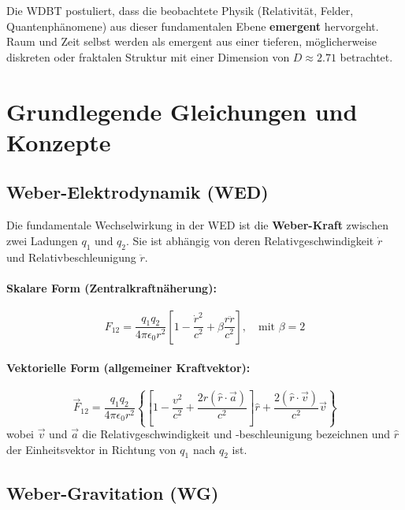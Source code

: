 \documentclass[11pt, a4paper]{article}
\begin{document}
Die WDBT postuliert, dass die beobachtete Physik (Relativität, Felder, Quantenphänomene) aus dieser fundamentalen Ebene \textbf{emergent} hervorgeht. Raum und Zeit selbst werden als emergent aus einer tieferen, möglicherweise diskreten oder fraktalen Struktur mit einer Dimension von $D \approx 2.71$ betrachtet.

\section{Grundlegende Gleichungen und Konzepte}
\label{sec:grundlagen}

\subsection{Weber-Elektrodynamik (WED)}
\label{subsec:wed}

Die fundamentale Wechselwirkung in der WED ist die \textbf{Weber-Kraft} zwischen zwei Ladungen $q_1$ und $q_2$. Sie ist abhängig von deren Relativgeschwindigkeit $\dot{r}$ und Relativbeschleunigung $\ddot{r}$.

\paragraph{Skalare Form (Zentralkraftnäherung):}
\begin{equation}
\label{eq:weber_skalar}
F_{12} = \frac{q_1 q_2}{4\pi\epsilon_0 r^2} \left[ 1 - \frac{\dot{r}^2}{c^2} + \beta \frac{r \ddot{r}}{c^2} \right], \quad \text{mit } \beta = 2
\end{equation}

\paragraph{Vektorielle Form (allgemeiner Kraftvektor):}
\begin{equation}
\label{eq:weber_vektor}
\vec{F}_{12} = \frac{q_1 q_2}{4\pi\epsilon_0 r^2} \left\{ \left[ 1 - \frac{v^2}{c^2} + \frac{2r (\hat{r} \cdot \vec{a})}{c^2} \right] \hat{r} + \frac{2 (\hat{r} \cdot \vec{v})}{c^2} \vec{v} \right\}
\end{equation}
wobei $\vec{v}$ und $\vec{a}$ die Relativgeschwindigkeit und -beschleunigung bezeichnen und $\hat{r}$ der Einheitsvektor in Richtung von $q_1$ nach $q_2$ ist.

\subsection{Weber-Gravitation (WG)}
\label{subsec:wg}
\end{document}
